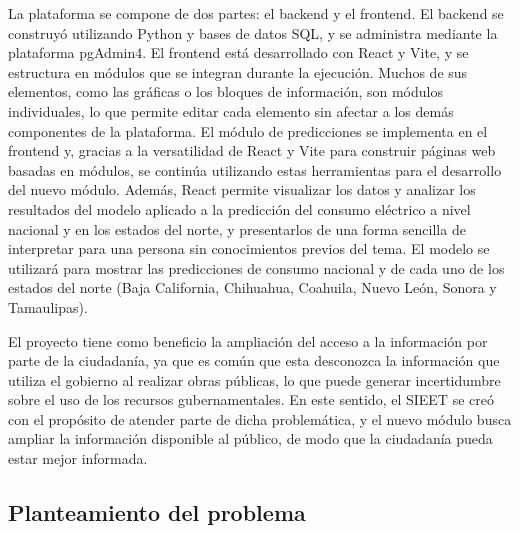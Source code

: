 La plataforma se compone de dos partes: el backend y el frontend. El backend se construyó utilizando Python y bases de datos SQL, y se administra mediante la plataforma pgAdmin4. El frontend está desarrollado con React y Vite, y se estructura en módulos que se integran durante la ejecución. Muchos de sus elementos, como las gráficas o los bloques de información, son módulos individuales, lo que permite editar cada elemento sin afectar a los demás componentes de la plataforma.
El módulo de predicciones se implementa en el frontend y, gracias a la versatilidad de React y Vite para construir páginas web basadas en módulos, se continúa utilizando estas herramientas para el desarrollo del nuevo módulo. Además, React permite visualizar los datos y analizar los resultados del modelo aplicado a la predicción del consumo eléctrico a nivel nacional y en los estados del norte, y presentarlos de una forma sencilla de interpretar para una persona sin conocimientos previos del tema. El modelo se utilizará para mostrar las predicciones de consumo nacional y de cada uno de los estados del norte (Baja California, Chihuahua, Coahuila, Nuevo León, Sonora y Tamaulipas).

El proyecto tiene como beneficio la ampliación del acceso a la información por parte de la ciudadanía, ya que es común que esta desconozca la información que utiliza el gobierno al realizar obras públicas, lo que puede generar incertidumbre sobre el uso de los recursos gubernamentales. En este sentido, el SIEET se creó con el propósito de atender parte de dicha problemática, y el nuevo módulo busca ampliar la información disponible al público, de modo que la ciudadanía pueda estar mejor informada.

\subsection{Planteamiento del problema} \label{sec:problema} %

